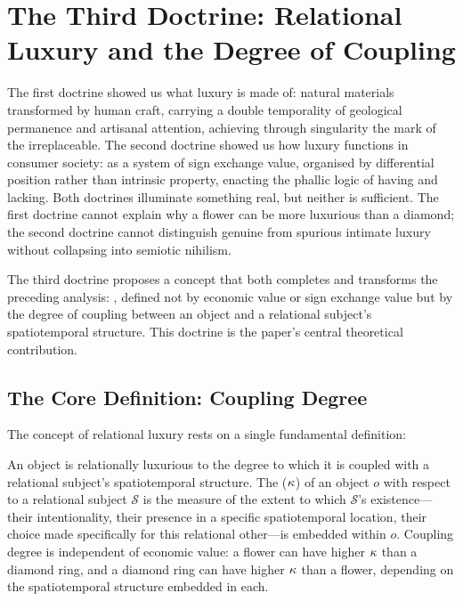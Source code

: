 \section{The Third Doctrine: Relational Luxury and the Degree of Coupling}
\label{p16:sec:relational}

\noindent
The first doctrine showed us what luxury is made of: natural materials transformed by human craft, carrying a double temporality of geological permanence and artisanal attention, achieving through singularity the mark of the irreplaceable. The second doctrine showed us how luxury functions in consumer society: as a system of sign exchange value, organised by differential position rather than intrinsic property, enacting the phallic logic of having and lacking. Both doctrines illuminate something real, but neither is sufficient. The first doctrine cannot explain why a flower can be more luxurious than a diamond; the second doctrine cannot distinguish genuine from spurious intimate luxury without collapsing into semiotic nihilism.

The third doctrine proposes a concept that both completes and transforms the preceding analysis: , defined not by economic value or sign exchange value but by the degree of coupling between an object and a relational subject's spatiotemporal structure. This doctrine is the paper's central theoretical contribution.

\subsection{The Core Definition: Coupling Degree}
\label{p16:subsec:core_definition}

\noindent
The concept of relational luxury rests on a single fundamental definition:

\begin{claim}
An object is relationally luxurious to the degree to which it is coupled with a relational subject's spatiotemporal structure. The  ($\kappa$) of an object $o$ with respect to a relational subject $\mathcal{S}$ is the measure of the extent to which $\mathcal{S}$'s existence---their intentionality, their presence in a specific spatiotemporal location, their choice made specifically for this relational other---is embedded within $o$. Coupling degree is independent of economic value: a flower can have higher $\kappa$ than a diamond ring, and a diamond ring can have higher $\kappa$ than a flower, depending on the spatiotemporal structure embedded in each.
\end{claim}

